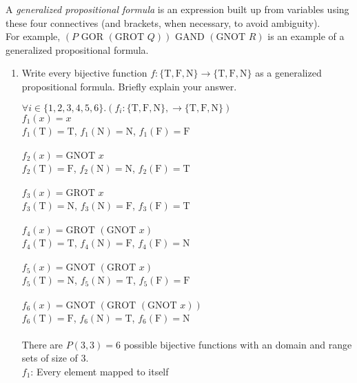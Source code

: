 \documentclass[11pt]{article}
\newcommand{\True}{\mbox{T}}
\newcommand{\False}{\mbox{F}}
\newcommand{\Neither}{\mbox{N}}
\newcommand{\gor}{\mbox{ GOR }}
\newcommand{\gand}{\mbox{ GAND }}
\newcommand{\gnot}{\mbox{GNOT }}
\newcommand{\grot}{\mbox{GROT }}
\begin{document}
\begin{enumerate}
\begin{question}
A {\em generalized propositional formula} is an expression built up from variables
using these four connectives
(and brackets, when necessary, to avoid ambiguity).\\
For example, $(P \gor (\grot Q)) \gand (\gnot R)$ is an example of a generalized
propositional formula.
\end{question}
\begin{enumerate}
\item
\begin{question}
Write every bijective function $f:\{\True,\False,\Neither\}  \rightarrow \{\True,\False,\Neither\}$
as a generalized propositional formula.
Briefly explain your answer.\\
\end{question}
\begin{solution}
$\forall i \in \{1,2,3,4,5,6\}.(f_i: \{\True,\False,\Neither\}, \rightarrow \{\True,\False,\Neither\})$\\

$f_1(x) = x$\\
$f_1(\True) = \True$, $f_1(\Neither) = \Neither$, $f_1(\False) = \False$\\\\
$f_2(x) = \gnot x$\\
$f_2(\True) = \False$, $f_2(\Neither) = \Neither$, $f_2(\False) = \True$\\\\
$f_3(x) = \grot x$\\
$f_3(\True) = \Neither$, $f_3(\Neither) = \False$, $f_3(\False) = \True$\\\\
$ f_4(x) = \grot(\gnot x)$\\
$f_4(\True) = \True$, $f_4(\Neither) = \False$, $f_4(\False) =\Neither$\\\\
$ f_5(x) = \gnot(\grot x)$\\
$f_5(\True) = \Neither$, $f_5(\Neither) = \True$, $f_5(\False) = \False$\\\\
$ f_6(x) = \gnot (\grot (\gnot x))$\\
$f_6(\True) = \False$, $f_6(\Neither) = \True$, $f_6(\False) = \Neither$\\\\
There are $P(3,3)= 6$ possible bijective functions with an domain and range sets of size of 3.\\

$f_1$: Every element mapped to itself


\end{solution}
\end{enumerate}
\end{enumerate}
\end{document}
